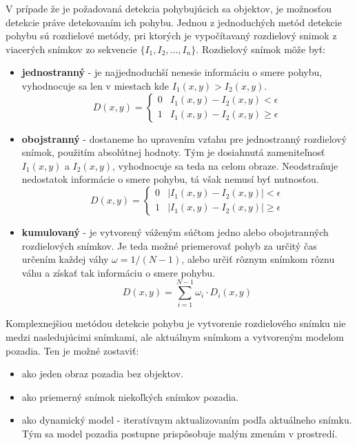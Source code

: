     V prípade že je požadovaná detekcia pohybujúcich sa objektov, je možnosťou detekcie práve detekovaním ich pohybu. Jednou z jednoduchých metód detekcie pohybu sú rozdielové metódy, pri ktorých je vypočítavaný rozdielový snimok z viacerých snímkov zo sekvencie \(\{I_1, I_2, ..., I_n\}\). Rozdielový snímok môže byť:

    \begin{itemize}
        \item \textbf{jednostranný} - je najjednoduchší nenesie informáciu o smere pohybu, vyhodnocuje sa len v miestach kde \(I_1(x,y) > I_2(x,y)\).
        \[D(x,y) = \begin{cases}
            0 & I_1(x,y) - I_2(x,y) < \epsilon \\
            1 & I_1(x,y) - I_2(x,y) \geq \epsilon
        \end{cases}\]

        \item \textbf{obojstranný} - dostaneme ho upravením vzťahu pre jednostranný rozdielový snímok, použitím absolútnej hodnoty. Tým je dosiahnutá zameniteľnosť \(I_1(x,y)\) a \(I_2(x,y)\), vyhodnocuje sa teda na celom obraze. Neodstraňuje nedostatok informácie o smere pohybu, tá však nemusí byť nutnosťou.
        \[D(x,y) = \begin{cases}
            0 & |I_1(x,y) - I_2(x,y)| < \epsilon \\
            1 & |I_1(x,y) - I_2(x,y)| \geq \epsilon
        \end{cases}\]

        \item \textbf{kumulovaný} - je vytvorený váženým súčtom jedno alebo obojstranných rozdielových snímkov. Je teda možné priemerovať pohyb za určitý čas určením každej váhy \(\omega = 1/(N-1)\), alebo určiť rôznym snímkom rôznu váhu a získať tak informáciu o smere pohybu.
        \[D(x,y) = \sum_{i=1}^{N-1}\omega_i \cdot D_i(x,y)\]
    \end{itemize}

    Komplexnejšiou metódou detekcie pohybu je vytvorenie rozdielového snímku nie medzi nasledujúcimi snímkami, ale aktuálnym snímkom a vytvoreným modelom pozadia. Ten je možné zostaviť:

    \begin{itemize}
        \item ako jeden obraz pozadia bez objektov.
        \item ako priemerný snímok niekoľkých snímkov pozadia.
        \item ako dynamický model - iteratívnym aktualizovaním podľa aktuálneho snímku. Tým sa model pozadia postupne prispôsobuje malým zmenám v prostredí.
    \end{itemize}

